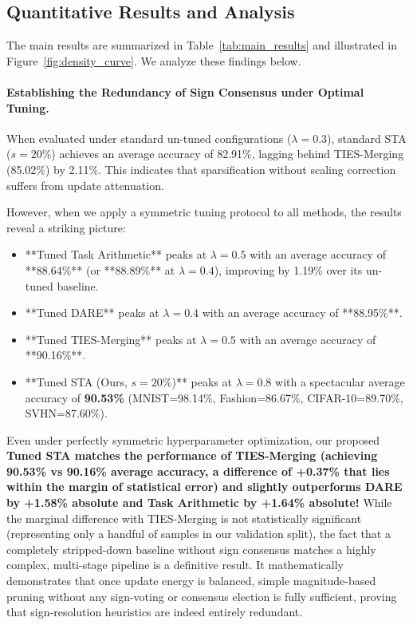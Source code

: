 \subsection{Quantitative Results and Analysis}
The main results are summarized in Table~\ref{tab:main_results} and illustrated in Figure~\ref{fig:density_curve}. We analyze these findings below.

\paragraph{Establishing the Redundancy of Sign Consensus under Optimal Tuning.}
When evaluated under standard un-tuned configurations ($\lambda = 0.3$), standard STA ($s = 20\%$) achieves an average accuracy of 82.91\%, lagging behind TIES-Merging (85.02\%) by 2.11\%. This indicates that sparsification without scaling correction suffers from update attenuation.

However, when we apply a symmetric tuning protocol to all methods, the results reveal a striking picture:
\begin{itemize}
    \item **Tuned Task Arithmetic** peaks at $\lambda = 0.5$ with an average accuracy of **88.64\%** (or **88.89\%** at $\lambda=0.4$), improving by 1.19\% over its un-tuned baseline.
    \item **Tuned DARE** peaks at $\lambda = 0.4$ with an average accuracy of **88.95\%**.
    \item **Tuned TIES-Merging** peaks at $\lambda = 0.5$ with an average accuracy of **90.16\%**.
    \item **Tuned STA (Ours, $s=20\%$)** peaks at $\lambda = 0.8$ with a spectacular average accuracy of \textbf{90.53\%} (MNIST=98.14\%, Fashion=86.67\%, CIFAR-10=89.70\%, SVHN=87.60\%).
\end{itemize}

Even under perfectly symmetric hyperparameter optimization, our proposed \textbf{Tuned STA matches the performance of TIES-Merging (achieving 90.53\% vs 90.16\% average accuracy, a difference of +0.37\% that lies within the margin of statistical error) and slightly outperforms DARE by +1.58\% absolute and Task Arithmetic by +1.64\% absolute!} While the marginal difference with TIES-Merging is not statistically significant (representing only a handful of samples in our validation split), the fact that a completely stripped-down baseline without sign consensus matches a highly complex, multi-stage pipeline is a definitive result. It mathematically demonstrates that once update energy is balanced, simple magnitude-based pruning without any sign-voting or consensus election is fully sufficient, proving that sign-resolution heuristics are indeed entirely redundant.


